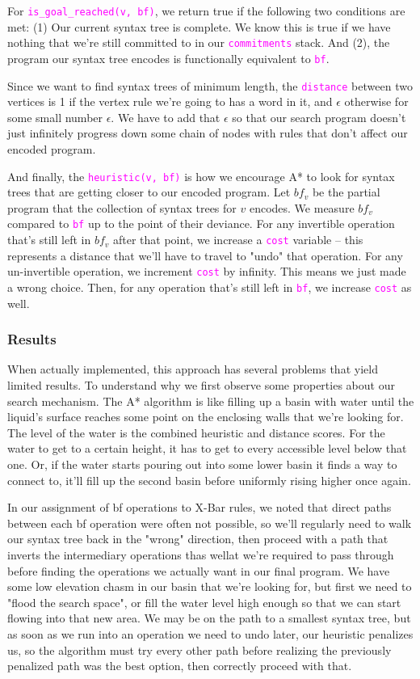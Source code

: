 \documentclass[runningheads]{llncs}
\newcommand{\code}[1]{\texttt{\textcolor{magenta}{\setlength{\fboxsep}{1pt}\colorbox{lightgray!20}{#1}}}}
\begin{document}
For \code{is\_goal\_reached(v, bf)}, we return true if the following two conditions are met: (1) Our current syntax tree is complete. We know this is true if we have nothing that we're still committed to in our \code{commitments} stack. And (2), the program our syntax tree encodes is functionally equivalent to \code{bf}.

Since we want to find syntax trees of minimum length, the \code{distance} between two vertices is 1 if the vertex rule we're going to has a word in it, and $\epsilon$ otherwise for some small number $\epsilon$. We have to add that $\epsilon$ so that our search program doesn't just infinitely progress down some chain of nodes with rules that don't affect our encoded program.

And finally, the \code{heuristic(v, bf)} is how we encourage A* to look for syntax trees that are getting closer to our encoded program. Let $bf_v$ be the partial program that the collection of syntax trees for $v$ encodes. We measure $bf_v$ compared to \code{bf} up to the point of their deviance. For any invertible operation that's still left in $bf_v$ after that point, we increase a \code{cost} variable -- this represents a distance that we'll have to travel to "undo" that operation. For any un-invertible operation, we increment \code{cost} by infinity. This means we just made a wrong choice. Then, for any operation that's still left in \code{bf}, we increase \code{cost} as well.

\subsubsection*{Results}
When actually implemented, this approach has several problems that yield limited results. To understand why we first observe some properties about our search mechanism. The A* algorithm  is like filling up a basin with water until the liquid's surface reaches some point on the enclosing walls that we're looking for. The level of the water is the combined heuristic and distance scores. For the water to get to a certain height, it has to get to every accessible level below that one. Or, if the water starts pouring out into some lower basin it finds a way to connect to, it'll fill up the second basin before uniformly rising higher once again.

In our assignment of bf operations to X-Bar rules, we noted that direct paths between each bf operation were often not possible, so we'll regularly need to walk our syntax tree back in the "wrong" direction, then proceed with a path that inverts the intermediary operations thas wellat we're required to pass through before finding the operations we actually want in our final program. We have some low elevation chasm in our basin that we're looking for, but first we need to "flood the search space", or fill the water level high enough so that we can start flowing into that new area. We may be on the path to a smallest syntax tree, but as soon as we run into an operation we need to undo later, our heuristic penalizes us, so the algorithm must try every other path before realizing the previously penalized path was the best option, then correctly proceed with that.
\end{document}
